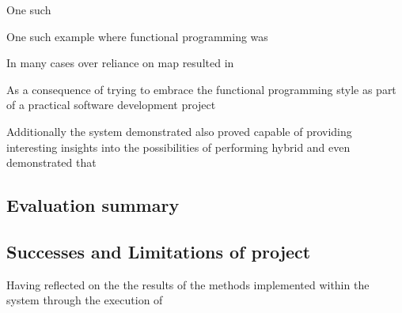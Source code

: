 One such 

One such example where functional programming was 


In many cases over reliance on map resulted in


As a consequence of trying to embrace the functional programming style as part of a practical software development project 




Additionally the system demonstrated also proved capable of providing interesting insights into the possibilities of performing hybrid and even demonstrated that 



\subsection{Evaluation summary}



\subsection{Successes and Limitations of project}
Having reflected on the the results of the methods implemented within the system through the execution of
